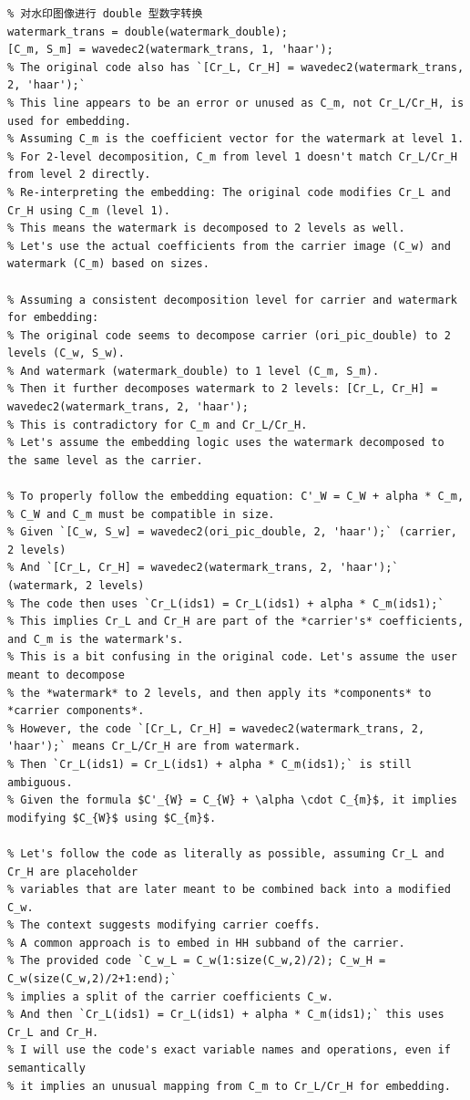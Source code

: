 \documentclass[12pt, a4paper]{article}
\begin{document}
\begin{small}
\begin{verbatim}
% 对水印图像进行 double 型数字转换
watermark_trans = double(watermark_double);
[C_m, S_m] = wavedec2(watermark_trans, 1, 'haar');
% The original code also has `[Cr_L, Cr_H] = wavedec2(watermark_trans, 2, 'haar');`
% This line appears to be an error or unused as C_m, not Cr_L/Cr_H, is used for embedding.
% Assuming C_m is the coefficient vector for the watermark at level 1.
% For 2-level decomposition, C_m from level 1 doesn't match Cr_L/Cr_H from level 2 directly.
% Re-interpreting the embedding: The original code modifies Cr_L and Cr_H using C_m (level 1).
% This means the watermark is decomposed to 2 levels as well.
% Let's use the actual coefficients from the carrier image (C_w) and watermark (C_m) based on sizes.

% Assuming a consistent decomposition level for carrier and watermark for embedding:
% The original code seems to decompose carrier (ori_pic_double) to 2 levels (C_w, S_w).
% And watermark (watermark_double) to 1 level (C_m, S_m).
% Then it further decomposes watermark to 2 levels: [Cr_L, Cr_H] = wavedec2(watermark_trans, 2, 'haar');
% This is contradictory for C_m and Cr_L/Cr_H.
% Let's assume the embedding logic uses the watermark decomposed to the same level as the carrier.

% To properly follow the embedding equation: C'_W = C_W + alpha * C_m,
% C_W and C_m must be compatible in size.
% Given `[C_w, S_w] = wavedec2(ori_pic_double, 2, 'haar');` (carrier, 2 levels)
% And `[Cr_L, Cr_H] = wavedec2(watermark_trans, 2, 'haar');` (watermark, 2 levels)
% The code then uses `Cr_L(ids1) = Cr_L(ids1) + alpha * C_m(ids1);`
% This implies Cr_L and Cr_H are part of the *carrier's* coefficients, and C_m is the watermark's.
% This is a bit confusing in the original code. Let's assume the user meant to decompose
% the *watermark* to 2 levels, and then apply its *components* to *carrier components*.
% However, the code `[Cr_L, Cr_H] = wavedec2(watermark_trans, 2, 'haar');` means Cr_L/Cr_H are from watermark.
% Then `Cr_L(ids1) = Cr_L(ids1) + alpha * C_m(ids1);` is still ambiguous.
% Given the formula $C'_{W} = C_{W} + \alpha \cdot C_{m}$, it implies modifying $C_{W}$ using $C_{m}$.

% Let's follow the code as literally as possible, assuming Cr_L and Cr_H are placeholder
% variables that are later meant to be combined back into a modified C_w.
% The context suggests modifying carrier coeffs.
% A common approach is to embed in HH subband of the carrier.
% The provided code `C_w_L = C_w(1:size(C_w,2)/2); C_w_H = C_w(size(C_w,2)/2+1:end);`
% implies a split of the carrier coefficients C_w.
% And then `Cr_L(ids1) = Cr_L(ids1) + alpha * C_m(ids1);` this uses Cr_L and Cr_H.
% I will use the code's exact variable names and operations, even if semantically
% it implies an unusual mapping from C_m to Cr_L/Cr_H for embedding.


\end{verbatim}
\end{small}
\end{document}

